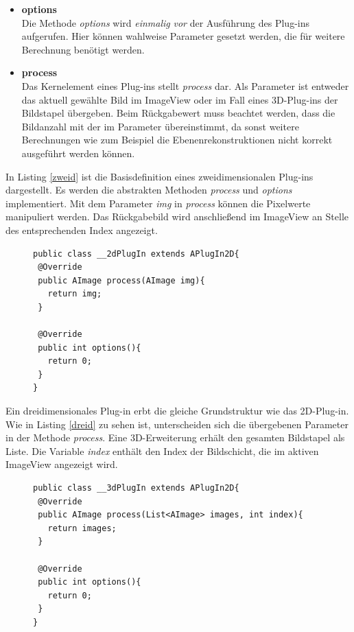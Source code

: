 \begin{itemize}
\item \textbf{options}\\
Die Methode \textit{options} wird \textit{einmalig} \textit{vor} der Ausführung des Plug-ins aufgerufen. Hier können wahlweise Parameter gesetzt werden, die für weitere Berechnung benötigt werden.
\item \textbf{process}\\
Das Kernelement eines Plug-ins stellt \textit{process} dar. Als Parameter ist entweder das aktuell gewählte Bild im ImageView oder im Fall eines 3D-Plug-ins der Bildstapel übergeben. Beim Rückgabewert muss beachtet werden, dass die Bildanzahl mit der im Parameter übereinstimmt, da sonst weitere Berechnungen wie zum Beispiel die Ebenenrekonstruktionen nicht korrekt ausgeführt werden können.

\end{itemize}

In Listing \ref{zweid} ist die Basisdefinition eines zweidimensionalen Plug-ins dargestellt. Es werden die abstrakten Methoden \textit{process} und \textit{options} implementiert. Mit dem Parameter \textit{img} in \textit{process} können die Pixelwerte manipuliert werden. Das Rückgabebild wird anschließend im ImageView an Stelle des entsprechenden Index angezeigt.

\begin{figure}[htbp]
\begin{lstlisting}[frame=leftline]
public class __2dPlugIn extends APlugIn2D{
 @Override
 public AImage process(AImage img){
   return img;
 }
 
 @Override
 public int options(){
   return 0;
 }
}
\end{lstlisting}
\end{figure}

Ein dreidimensionales Plug-in erbt die gleiche Grundstruktur wie das 2D-Plug-in. Wie in Listing \ref{dreid} zu sehen ist, unterscheiden sich die übergebenen Parameter in der Methode \textit{process}. Eine 3D-Erweiterung erhält den gesamten Bildstapel als Liste. Die Variable \textit{index} enthält den Index der Bildschicht, die im  aktiven ImageView angezeigt wird.

\begin{figure}[htbp]
\begin{lstlisting}[frame=leftline]
public class __3dPlugIn extends APlugIn2D{
 @Override
 public AImage process(List<AImage> images, int index){
   return images;
 }
 
 @Override
 public int options(){
   return 0;
 }
}
\end{lstlisting}
\end{figure}




